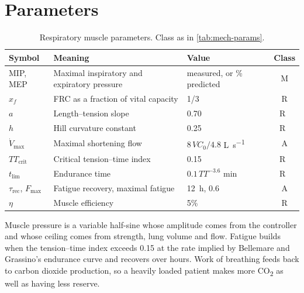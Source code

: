 \section{Parameters}
\begin{table}[ht]
\centering
\caption{Respiratory muscle parameters. Class as in \cref{tab:mech-params}.}
\label{tab:mus-params}
\small
\begin{tabularx}{\linewidth}{@{}l X l c@{}}
\toprule
Symbol & Meaning & Value & Class \\
\midrule
MIP, MEP & Maximal inspiratory and expiratory pressure & measured, or \% predicted~\citep{evans2009} & M \\
$x_f$ & FRC as a fraction of vital capacity & 1/3 & R \\
$a$ & Length--tension slope & 0.70 & R~\citep{braun1982} \\
$h$ & Hill curvature constant & 0.25 & R~\citep{hill1938} \\
$\dot V_{\max}$ & Maximal shortening flow & $8\,VC_0/4.8$ \si{\liter\per\second} & A \\
$TT_{\mathrm{crit}}$ & Critical tension--time index & 0.15 & R~\citep{bellemare1982} \\
$t_{\lim}$ & Endurance time & $0.1\,TT^{-3.6}$ min & R~\citep{bellemare1982} \\
$\tau_{\mathrm{rec}}$, $F_{\max}$ & Fatigue recovery, maximal fatigue & \SI{12}{\hour}, 0.6 & A \\
$\eta$ & Muscle efficiency & 5\% & R \\
\bottomrule
\end{tabularx}
\end{table}

\begin{summarybox}
Muscle pressure is a variable half-sine whose amplitude comes from the controller and whose ceiling comes from strength, lung volume and flow. Fatigue builds when the tension--time index exceeds 0.15 at the rate implied by Bellemare and Grassino's endurance curve and recovers over hours. Work of breathing feeds back to carbon dioxide production, so a heavily loaded patient makes more CO\textsubscript{2} as well as having less reserve.
\end{summarybox}
